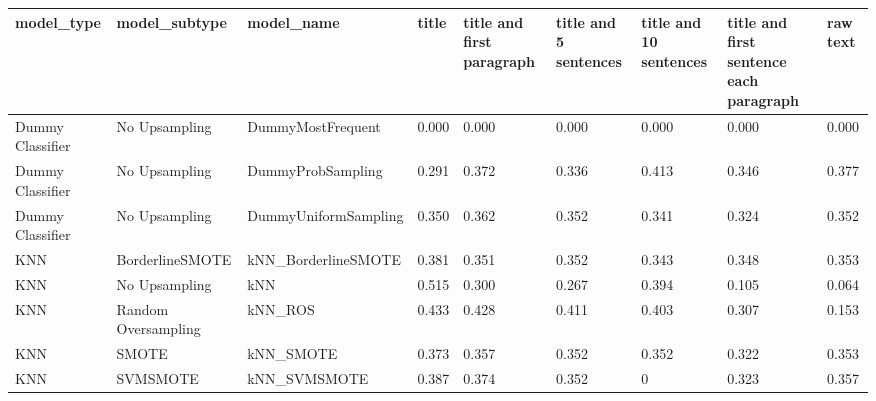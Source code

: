 \begin{tabular}{lllllllll}
\toprule
                  model\_type &       model\_subtype &                                   model\_name & title & title and first paragraph & title and 5 sentences & title and 10 sentences & title and first sentence each paragraph &  raw text \\
\midrule
            Dummy Classifier &       No Upsampling &                            DummyMostFrequent & 0.000 &                     0.000 &                 0.000 &                  0.000 &                                   0.000 &     0.000 \\
            Dummy Classifier &       No Upsampling &                            DummyProbSampling & 0.291 &                     0.372 &                 0.336 &                  0.413 &                                   0.346 &     0.377 \\
            Dummy Classifier &       No Upsampling &                         DummyUniformSampling & 0.350 &                     0.362 &                 0.352 &                  0.341 &                                   0.324 &     0.352 \\
                         KNN &     BorderlineSMOTE &                          kNN\_BorderlineSMOTE & 0.381 &                     0.351 &                 0.352 &                  0.343 &                                   0.348 &     0.353 \\
                         KNN &       No Upsampling &                                          kNN & 0.515 &                     0.300 &                 0.267 &                  0.394 &                                   0.105 &     0.064 \\
                         KNN & Random Oversampling &                                      kNN\_ROS & 0.433 &                     0.428 &                 0.411 &                  0.403 &                                   0.307 &     0.153 \\
                         KNN &               SMOTE &                                    kNN\_SMOTE & 0.373 &                     0.357 &                 0.352 &                  0.352 &                                   0.322 &     0.353 \\
                         KNN &            SVMSMOTE &                                 kNN\_SVMSMOTE & 0.387 &                     0.374 &                 0.352 &                      0 &                                   0.323 &     0.357 \\

\end{tabular}
